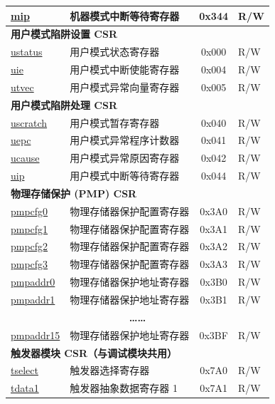 \begin{longtable}{ | p{4.0cm} | p{8.4cm} | c | l | }
\hyperref[regdesc:MIP]{mip} & 机器模式中断等待寄存器 & 0x344 & R/W \\\hline
\multicolumn{4}{|l|}{\textbf{用户模式陷阱设置 CSR}} \\\hline
\hyperref[regdesc:USTATUS]{ustatus} & 用户模式状态寄存器 & 0x000 & R/W \\\hline
\hyperref[regdesc:UIE]{uie} & 用户模式中断使能寄存器 & 0x004 & R/W \\\hline
\hyperref[regdesc:UTVEC]{utvec} & 用户模式异常向量寄存器 & 0x005 & R/W \\\hline
\multicolumn{4}{|l|}{\textbf{用户模式陷阱处理 CSR}} \\\hline
\hyperref[regdesc:USCRATCH]{uscratch} & 用户模式暂存寄存器 & 0x040 & R/W \\\hline
\hyperref[regdesc:UEPC]{uepc} & 用户模式异常程序计数器 & 0x041 & R/W \\\hline
\hyperref[regdesc:UCAUSE]{ucause} & 用户模式异常原因寄存器 & 0x042 & R/W \\\hline
\hyperref[regdesc:UIP]{uip} & 用户模式中断等待寄存器 & 0x044 & R/W \\\hline
\multicolumn{4}{|l|}{\textbf{物理存储保护 (PMP) CSR}} \\\hline\hyperref[sec:riscvcpu-pmp-reg-desc]{pmpcfg0} & 物理存储器保护配置寄存器 & 0x3A0 & R/W \\\hline
\hyperref[sec:riscvcpu-pmp-reg-desc]{pmpcfg1} & 物理存储器保护配置寄存器 & 0x3A1 & R/W \\\hline
\hyperref[sec:riscvcpu-pmp-reg-desc]{pmpcfg2} & 物理存储器保护配置寄存器 & 0x3A2 & R/W \\\hline
\hyperref[sec:riscvcpu-pmp-reg-desc]{pmpcfg3} & 物理存储器保护配置寄存器 & 0x3A3 & R/W \\\hline
\hyperref[sec:riscvcpu-pmp-reg-desc]{pmpaddr0} & 物理存储器保护地址寄存器 & 0x3B0 & R/W \\\hline
\hyperref[sec:riscvcpu-pmp-reg-desc]{pmpaddr1} & 物理存储器保护地址寄存器 & 0x3B1 & R/W \\\hline
\multicolumn{4}{|c|}{\textbf{……}} \\\hline
\hyperref[sec:riscvcpu-pmp-reg-desc]{pmpaddr15} & 物理存储器保护地址寄存器 & 0x3BF & R/W \\\hline
\multicolumn{4}{|l|}{\textbf{触发器模块 CSR（与调试模块共用）}} \\\hline
\hyperref[regdesc:TSELECT]{tselect} & 触发器选择寄存器 & 0x7A0 & R/W \\\hline
\hyperref[regdesc:TDATA1]{tdata1} & 触发器抽象数据寄存器 1 & 0x7A1 & R/W \\\hline

\end{longtable}
